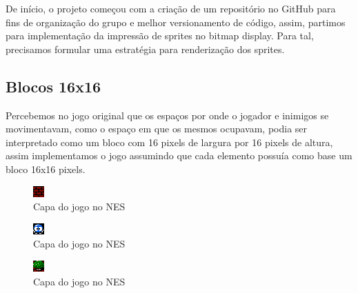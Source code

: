 \documentclass[10pt, conference, compsocconf]{IEEEtran}
\begin{document}
De início, o projeto começou com a criação de um repositório no GitHub para fins
de organização do grupo e melhor versionamento de código, assim, partimos para
implementação da impressão de sprites no bitmap display. Para tal, precisamos
formular uma estratégia para renderização dos sprites.

\subsection{Blocos 16x16}{
\label{sec:MIPS}
Percebemos no jogo original que os espaços por onde
o jogador e inimigos se movimentavam, como o espaço
em que os mesmos ocupavam, podia ser interpretado
como um bloco com 16 pixels de largura por 16 pixels de altura, assim implementamos o jogo assumindo
que cada elemento possuía como base um bloco 16x16
pixels.

}
\begin{figure}[htb]
  \begin{center}
   \includegraphics[width=0.3\linewidth]{./Figures/image_2.png}
  \end{center}
  \caption{Capa do jogo no NES}
  \label{fig:01}
\end{figure}

\begin{figure}[htb]
  \begin{center}
   \includegraphics[width=0.3\linewidth]{./Figures/image_3.png}
  \end{center}
  \caption{Capa do jogo no NES}
  \label{fig:01}
\end{figure}

\begin{figure}[htb]
  \begin{center}
   \includegraphics[width=0.3\linewidth]{./Figures/image_4.png}
  \end{center}
  \caption{Capa do jogo no NES}
  \label{fig:01}
\end{figure}
\end{document}
